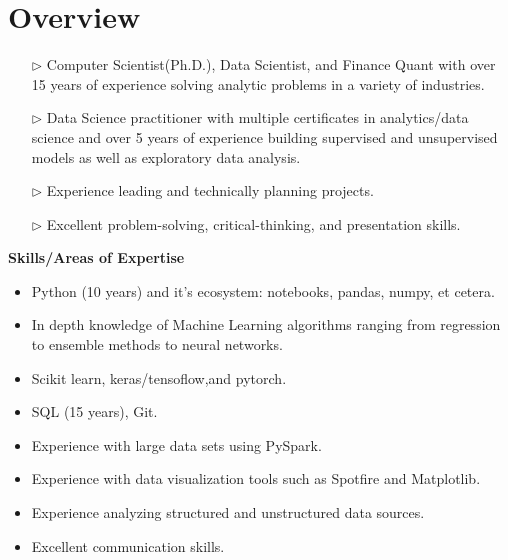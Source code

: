 \documentclass[10pt, letterpaper]{article} %
\providecommand{\tightlist}{%
  \setlength{\itemsep}{0pt}\setlength{\parskip}{0pt}}
\begin{document}
\vspace{-5pt}
\hypertarget{professional-experience}{\section{\texorpdfstring{
{ \textbf{ {Overview}}}}{Overview}}\label{professional-experience}}
\begin{itemize}
\tightlist

\item[$\triangleright$] Computer Scientist(Ph.D.), Data Scientist, and Finance Quant with over 15 years of experience solving analytic problems in a variety of industries. 

\item[$\triangleright$] Data Science practitioner with multiple certificates in analytics/data science and over 5 years of experience building supervised and unsupervised models as well as exploratory data analysis. 

\item[$\triangleright$] Experience leading and technically planning projects.

\item[$\triangleright$]  Excellent problem-solving, critical-thinking, and presentation skills.

\end{itemize}
{\textbf {Skills/Areas of Expertise}}
\vspace{-7pt}
\begin{multicols}{2}
  \begin{itemize}
	\tightlist
	\item Python (10 years) and it's ecosystem: notebooks, pandas, numpy, et cetera.
	\item In depth knowledge of Machine Learning algorithms ranging from regression to ensemble methods to neural networks.	
	\item Scikit learn, keras/tensoflow,and pytorch.
	\item SQL (15 years), Git.
	\item Experience with large data sets using PySpark.
	\item Experience with data visualization tools such as Spotfire and Matplotlib.
	\item Experience analyzing structured and unstructured data sources.
     \item Excellent communication skills.
\end{itemize}
\end{multicols}
\vspace{-10pt}
\end{document}
